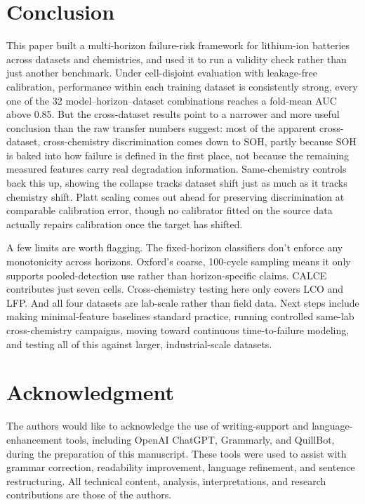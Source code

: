 \documentclass[conference]{IEEEtran}
\begin{document}
\section{Conclusion}
This paper built a multi-horizon failure-risk framework for
lithium-ion batteries across datasets and chemistries, and used it to
run a validity check rather than just another benchmark. Under
cell-disjoint evaluation with leakage-free calibration, performance
within each training dataset is consistently strong, every one of the
32 model--horizon--dataset combinations reaches a fold-mean AUC above
0.85. But the cross-dataset results point to a narrower and more
useful conclusion than the raw transfer numbers suggest: most of the
apparent cross-dataset, cross-chemistry discrimination comes down to
SOH, partly because SOH is baked into how failure is defined in the
first place, not because the remaining measured features carry real
degradation information. Same-chemistry controls back this up, showing
the collapse tracks dataset shift just as much as it tracks chemistry
shift. Platt scaling comes out ahead for preserving discrimination at
comparable calibration error, though no calibrator fitted on the
source data actually repairs calibration once the target has shifted.

A few limits are worth flagging. The fixed-horizon classifiers don't
enforce any monotonicity across horizons. Oxford's coarse, 100-cycle
sampling means it only supports pooled-detection use rather than
horizon-specific claims. CALCE contributes just seven cells.
Cross-chemistry testing here only covers LCO and LFP. And all four
datasets are lab-scale rather than field data. Next steps include
making minimal-feature baselines standard practice, running controlled
same-lab cross-chemistry campaigns, moving toward continuous
time-to-failure modeling, and testing all of this against larger,
industrial-scale datasets.

\section*{Acknowledgment}
The authors would like to acknowledge the use of writing-support and
language-enhancement tools, including OpenAI ChatGPT, Grammarly, and
QuillBot, during the preparation of this manuscript. These tools were
used to assist with grammar correction, readability improvement,
language refinement, and sentence restructuring. All technical
content, analysis, interpretations, and research contributions are
those of the authors.
\end{document}
